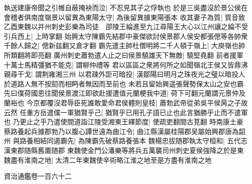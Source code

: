 執送建康帝聞之引帷自蔽掩袂而泣|{
	不忍見其子之俘執也}
於是三吳盡沒於景公侯在會稽者俱南度嶺景以留異為東陽太守|{
	為後留異據東陽張本}
收其妻子為質|{
	質音致}
乙酉東魏以并州刺史彭樂為司徒　邵陵王綸進至九江尋陽王大心以江州讓之綸不受引兵西上|{
	上時掌翻}
始興太守陳霸先結郡中豪傑欲討侯景郡人侯安都張偲等各帥衆千餘人歸之|{
	偲新兹翻又倉才翻}
霸先遣主帥杜僧明將二千人頓于嶺上|{
	大庾嶺也帥所類翻將即亮翻}
廣州刺史蕭勃遣人止之曰侯景驍雄天下無敵|{
	驍堅堯翻}
前者援軍十萬士馬精彊猶不能克|{
	謂柳仲禮等}
君以區區之衆將何所之如聞嶺北王侯又皆鼎沸親尋干戈|{
	謂荆雍湘三州}
以君疎外詎可暗投|{
	漢鄒陽曰明月之珠夜光之璧以暗投人於道路人無不按劎而相眄者無因而至前也}
未若且留始興遥張聲勢保太山之安也霸先曰僕荷國恩往聞侯景渡江即欲赴援遭值元蘭梗我中道|{
	荷下可翻元蘭謂元景仲及蘭裕也}
今京都覆沒君辱臣死誰敢愛命君侯體則皇枝|{
	蕭勃武帝從弟吳平侯昺之子故云然}
任重方岳遣僕一軍猶賢乎己|{
	猶賢乎已用孔子語已止也此言猶勝乎止而不遣軍也}
乃更止之乎乃遣使間道詣江陵受湘東王繹節度|{
	使疏吏翻間古莧翻}
時南康土豪蔡路養起兵據郡勃乃以腹心譚世遠為曲江令|{
	曲江縣漢屬桂陽郡吴屬始興郡唐為韶州}
與路養相結同遏霸先|{
	為陳霸先破蔡路養張本}
魏楊忠拔随郡執太守桓和|{
	五代志漢東郡随縣舊置随郡}
東魏使金門公潘樂等將兵五萬襲司州刺史夏侯強降之於是東魏盡有淮南之地|{
	太清二年東魏使辛術略江淮之地至是方盡有淮南之地}


資治通鑑卷一百六十二
